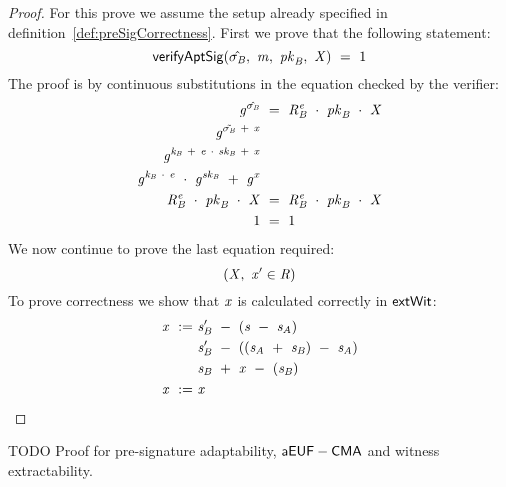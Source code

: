 \begin{proof}
    \label{prf:aptSchnorrPreSigCorr}
    For this prove we assume the setup already specified in definition~\ref{def:preSigCorrectness}.
    First we prove that the following statement:
    \[
        \mathsf{verifyAptSig}(\hat{\sigma_{\mathit{B}}} ,~ \mathit{m} ,~ \mathit{pk}_{\mathit{B}} ,~ \mathit{X}) ~=~ 1
    \]
    The proof is by continuous substitutions in the equation checked by the verifier:
    \begin{align}
        \mathit{g}^{\hat{\sigma_{\mathit{B}}}} &~=~ \mathit{R}_{\mathit{B}}^{\mathit{e}} ~\cdot~ \mathit{pk}_{\mathit{B}} ~\cdot~ \mathit{X} \\
        \mathit{g}^{\tilde{\sigma_{\mathit{B}}} ~+~ \mathit{x}} & \\
        \mathit{g}^{\mathit{\mathit{k}_{\mathit{B}}} ~+~ \mathit{e} ~\cdot~ \mathit{sk}_{\mathit{B}} ~+~ \mathit{x}} & \\
        \mathit{g}^{\mathit{\mathit{k}_{\mathit{B}}} ~\cdot~ \mathit{e}} ~\cdot~ \mathit{g}^{\mathit{sk}_{\mathit{B}}} ~+~ \mathit{g}^{\mathit{x}} & \\
        \mathit{R}_{\mathit{B}}^{\mathit{e}} ~\cdot~ \mathit{pk}_{\mathit{B}} ~\cdot~ \mathit{X} &~=~ \mathit{R}_{\mathit{B}}^{\mathit{e}} ~\cdot~ \mathit{pk}_{\mathit{B}} ~\cdot~ \mathit{X} \\
        1 &~=~ 1
    \end{align}
    We now continue to prove the last equation required:
    \[
        (\mathit{X} ,~ \mathit{x}' \in \mathit{R})
    \]
    To prove correctness we show that $\mathit{x}$ is calculated correctly in $\mathsf{extWit}$:
    \begin{align}
        \mathit{x} ~:=~ & \mathit{s}_{\mathit{B}}' ~-~ (\mathit{s} ~-~ \mathit{s}_{\mathit{A}}) \\
        & \mathit{s}_{\mathit{B}}' ~-~ ((\mathit{s}_{\mathit{A}} ~+~ \mathit{s}_{\mathit{B}} ) ~-~ \mathit{s}_{\mathit{A}} ) \\
        & \mathit{s}_{\mathit{B}} ~+~ \mathit{x} ~-~ (\mathit{s}_{\mathit{B}}) \\
        \mathit{x} ~:=~ & \mathit{x} \\
    \end{align}

\end{proof}

TODO Proof for pre-signature adaptability, $\mathsf{aEUF-CMA}$ and witness extractability.